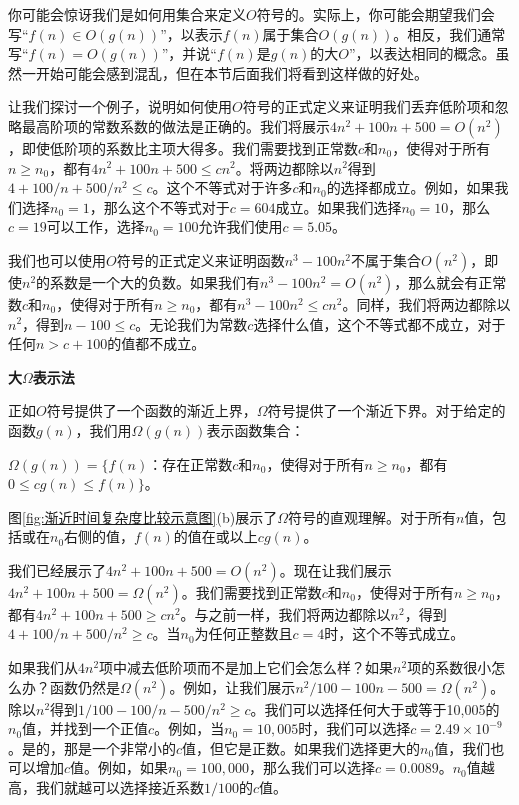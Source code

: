 \documentclass[lang=cn,newtx,10pt,scheme=chinese]{elegantbook}
\begin{document}
你可能会惊讶我们是如何用集合来定义$O$符号的。实际上，你可能会期望我们会写“$f(n) \in O(g(n))$”，以表示$f(n)$属于集合$O(g(n))$。相反，我们通常写“$f(n)=O(g(n))$”，并说``$f(n)$是$g(n)$的大$O$''，以表达相同的概念。虽然一开始可能会感到混乱，但在本节后面我们将看到这样做的好处。

让我们探讨一个例子，说明如何使用$O$符号的正式定义来证明我们丢弃低阶项和忽略最高阶项的常数系数的做法是正确的。我们将展示$4 n^2+100 n+500=O\left(n^2\right)$，即使低阶项的系数比主项大得多。我们需要找到正常数$c$和$n_0$，使得对于所有$n \geq n_0$，都有$4 n^2+100 n+500 \leq c n^2$。将两边都除以$n^2$得到$4+100 / n+500 / n^2 \leq c$。这个不等式对于许多$c$和$n_0$的选择都成立。例如，如果我们选择$n_0=1$，那么这个不等式对于$c=604$成立。如果我们选择$n_0=10$，那么$c=19$可以工作，选择$n_0=100$允许我们使用$c=5.05$。

我们也可以使用$O$符号的正式定义来证明函数$n^3-100 n^2$不属于集合$O\left(n^2\right)$，即使$n^2$的系数是一个大的负数。如果我们有$n^3-100 n^2=O\left(n^2\right)$，那么就会有正常数$c$和$n_0$，使得对于所有$n \geq n_0$，都有$n^3-100 n^2 \leq c n^2$。同样，我们将两边都除以$n^2$，得到$n-100 \leq c$。无论我们为常数$c$选择什么值，这个不等式都不成立，对于任何$n>c+100$的值都不成立。

\textbf{大$\Omega$表示法}

正如$O$符号提供了一个函数的渐近上界，$\Omega$符号提供了一个渐近下界。对于给定的函数$g(n)$，我们用$\Omega(g(n))$表示函数集合：

$\Omega(g(n))=\{f(n)$：存在正常数$c$和$n_0$，使得对于所有$n \geq n_0$，都有$0 \leq c g(n) \leq f(n)\}$。

图\ref{fig:渐近时间复杂度比较示意图}(b)展示了$\Omega$符号的直观理解。对于所有$n$值，包括或在$n_0$右侧的值，$f(n)$的值在或以上$c g(n)$。

我们已经展示了$4 n^2+100 n+500=O\left(n^2\right)$。现在让我们展示$4 n^2+100 n+500=\Omega\left(n^2\right)$。我们需要找到正常数$c$和$n_0$，使得对于所有$n \geq n_0$，都有$4 n^2+100 n+500 \geq c n^2$。与之前一样，我们将两边都除以$n^2$，得到$4+100 / n+500 / n^2 \geq c$。当$n_0$为任何正整数且$c=4$时，这个不等式成立。

如果我们从$4n^2$项中减去低阶项而不是加上它们会怎么样？如果$n^2$项的系数很小怎么办？函数仍然是$\Omega\left(n^2\right)$。例如，让我们展示$n^2 / 100-100 n-500=\Omega\left(n^2\right)$。除以$n^2$得到$1 / 100-100 / n-500 / n^2 \geq c$。我们可以选择任何大于或等于10,005的$n_0$值，并找到一个正值$c$。例如，当$n_0=10,005$时，我们可以选择$c=2.49 \times 10^{-9}$。是的，那是一个非常小的$c$值，但它是正数。如果我们选择更大的$n_0$值，我们也可以增加$c$值。例如，如果$n_0=100,000$，那么我们可以选择$c=0.0089$。$n_0$值越高，我们就越可以选择接近系数$1 / 100$的$c$值。
\end{document}
